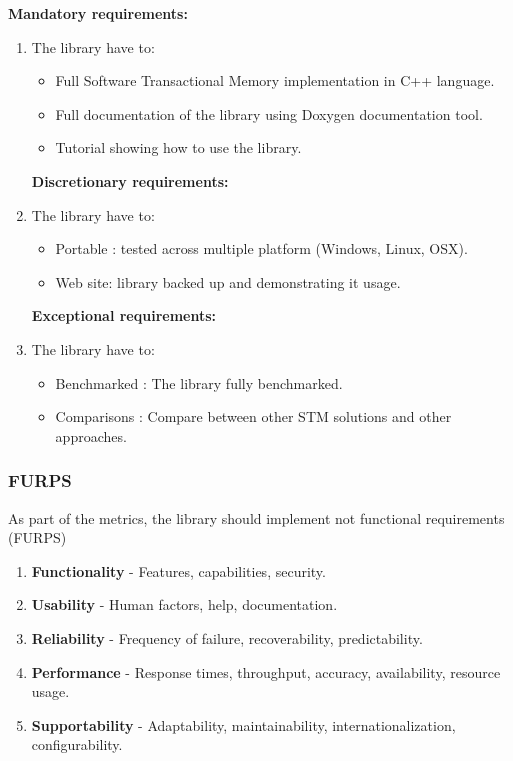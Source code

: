 \documentclass[12pt]{article}
\begin{document}
\textbf{Mandatory requirements:} 
\begin{enumerate}
\item The library have to:
	\begin{itemize}
	\item Full Software Transactional Memory implementation in C++ language.
	\item Full documentation of the library using Doxygen documentation tool.
	\item Tutorial showing how to use the library.
	\end{itemize}


\textbf{Discretionary requirements:} 

\item The library have to:
	\begin{itemize}
	\item Portable : tested across multiple platform (Windows, Linux, OSX).
	\item Web site: library backed up and demonstrating it usage.
	\end{itemize}

\clearpage
\textbf{Exceptional requirements:} 

\item The library have to:
	\begin{itemize}
	\item Benchmarked : The library fully benchmarked.
	\item Comparisons : Compare between other STM solutions and other approaches.
	\end{itemize}
\end{enumerate}

\subsubsection{FURPS}
As part of the metrics, the library should implement not functional requirements (FURPS)\cite{PPTX}
\begin{enumerate}
\item \textbf{Functionality} - Features, capabilities, security.
\item \textbf{Usability} - Human factors, help, documentation. 
\item \textbf{Reliability} - Frequency of failure, recoverability, predictability.
\item \textbf{Performance} - Response times, throughput, accuracy, availability,
resource usage. 
\item \textbf{Supportability} - Adaptability, maintainability, internationalization,
configurability. 
\end{enumerate}
\end{document}
